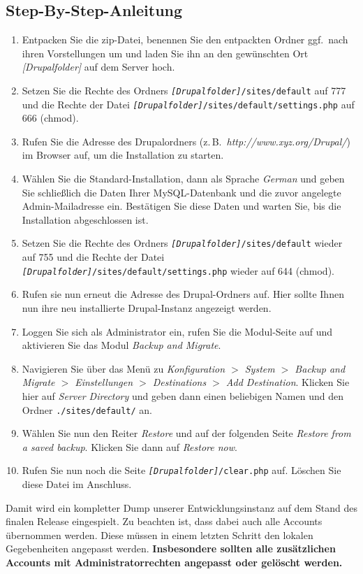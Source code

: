 \documentclass[a4paper,11pt,twoside]{article}
\begin{document}
\subsection{Step-By-Step-Anleitung}
\begin{enumerate}
\item Entpacken Sie die zip-Datei, benennen Sie den entpackten Ordner
  ggf.\ nach ihren Vorstellungen um und laden Sie ihn an den gewünschten Ort
  \textit{[Drupalfolder]} auf dem Server hoch.
\item Setzen Sie die Rechte des Ordners
  \texttt{\textit{[Drupalfolder]}/sites/default} auf 777 und die Rechte der
  Datei \texttt{\textit{[Drupalfolder]}/sites/default/settings.php} auf 666
  (chmod).
\item Rufen Sie die Adresse des Drupalordners
  (z.\,B.\ \textit{http://www.xyz.org/Drupal/}) im Browser auf, um die
  Installation zu starten.
\item Wählen Sie die Standard-Installation, dann als Sprache \emph{German} und
  geben Sie schließlich die Daten Ihrer MySQL-Datenbank und die zuvor
  angelegte Admin-Mailadresse ein. Bestätigen Sie diese Daten und warten Sie,
  bis die Installation abgeschlossen ist.
\item Setzen Sie die Rechte des Ordners
  \texttt{\textit{[Drupalfolder]}/sites/default} wieder auf 755 und die Rechte
  der Datei \texttt{\textit{[Drupalfolder]}/sites/default/settings.php} wieder
  auf 644 (chmod).
\item Rufen sie nun erneut die Adresse des Drupal-Ordners auf. Hier sollte
  Ihnen nun ihre neu installierte Drupal-Instanz angezeigt werden.
\item Loggen Sie sich als Administrator ein, rufen Sie die Modul-Seite auf und
  aktivieren Sie das Modul \emph{Backup and Migrate}.
\item Navigieren Sie über das Menü zu \emph{Konfiguration $>$ System $>$
  Backup and Migrate $>$ Einstellungen $>$ Destinations $>$ Add Destination}.
  Klicken Sie hier auf \emph{Server Directory} und geben dann einen beliebigen
  Namen und den Ordner \texttt{./sites/default/} an.
\item Wählen Sie nun den Reiter \emph{Restore} und auf der folgenden Seite
  \emph{Restore from a saved backup}. Klicken Sie dann auf \emph{Restore now}.
\item Rufen Sie nun noch die Seite \texttt{\textit{[Drupalfolder]}/clear.php}
  auf.  Löschen Sie diese Datei im Anschluss.
\end{enumerate}
Damit wird ein kompletter Dump unserer Entwicklungsinstanz auf dem Stand des
finalen Release eingespielt. Zu beachten ist, dass dabei auch alle Accounts
übernommen werden. Diese müssen in einem letzten Schritt den lokalen
Gegebenheiten angepasst werden. \textbf{Insbesondere sollten alle zusätzlichen
Accounts mit Administratorrechten angepasst oder gelöscht werden.}
\end{document}
